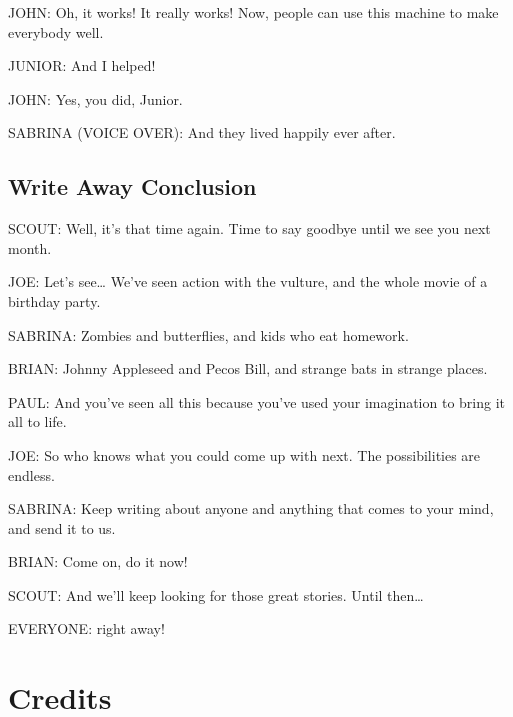 JOHN:
Oh, it works!
It really works!
Now, people can use this machine to make everybody well.

JUNIOR:
And I helped!

JOHN:
Yes, you did, Junior.

SABRINA (VOICE OVER):
And they lived happily ever after.

\subsection{Write Away Conclusion}

SCOUT:
Well, it's that time again.
Time to say goodbye until we see you next month.

JOE:
Let's see\dots
We've seen action with the vulture, and the whole movie of a birthday party.

SABRINA:
Zombies and butterflies, and kids who eat homework.

BRIAN:
Johnny Appleseed and Pecos Bill, and strange bats in strange places.

PAUL:
And you've seen all this because you've used your imagination to bring it all to life.

JOE:
So who knows what you could come up with next.
The possibilities are endless.

SABRINA:
Keep writing about anyone and anything that comes to your mind, and send it to us.

BRIAN:
Come on, do it now!

SCOUT:
And we'll keep looking for those great stories.
Until then\dots

EVERYONE:
right away!

\section{Credits}